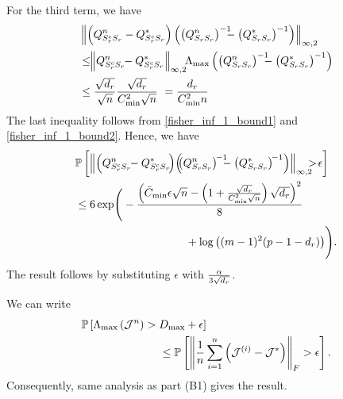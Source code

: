 For the third term, we have
\begin{equation}
\begin{aligned}
&\norm{\left(\fisher^n_{\support^c_\svert\support_\svert}-\fisher^*_{\support^c_\svert\support_\svert}\right) \left(\left(\fisher^n_{\support_\svert\support_\svert}\right)^{-1}\!\!\!\! -\left(\fisher^*_{\support_\svert\support_\svert}\right)^{-1}\right)}{\infty,2}\\ &\leq\!\! \norm{\fisher^n_{\support^c_\svert\support_\svert}\!\!-\fisher^*_{\support^c_\svert\support_\svert}}{\infty,2} \!\!\Lambda_{\max}\left(\left(\fisher^n_{\support_\svert\support_\svert}\right)^{-1}\!\!\!\! -\left(\fisher^*_{\support_\svert\support_\svert}\right)^{-1}\right)\\
&\leq\frac{\sqrt{d_\svert}}{\sqrt{n}}\frac{\sqrt{d_\svert}}{C_{\min}^2\sqrt{n}}\,\,=\frac{d_\svert}{C_{\min}^2n}
\end{aligned}
\nonumber
\end{equation}
The last inequality follows from \eqref{fisher_inf_1_bound1} and \eqref{fisher_inf_1_bound2}. Hence, we have
\begin{equation}
\begin{aligned}
&\mathbb{P}\left[\norm{\left(\fisher^n_{\support^c_\svert\support_\svert}\!\! -\fisher^*_{\support^c_\svert\support_\svert}\!\right)\! \left(\!\!\left(\fisher^n_{\support_\svert\support_\svert}\right)^{\!-1}\!\!\!\! -\left(\fisher^*_{\support_\svert\support_\svert}\right)^{\!-1}\right)}{\infty,2}\!\!\!\!>\!\epsilon\right]\\ &\leq 6\exp\Biggr(-\frac{\left(\bar{C}_{\min}\epsilon\sqrt{n}-\left(1+\frac{\sqrt{d_\svert}}{C_{\min}^2\sqrt{n}}\right)\sqrt{d_\svert}\right)^2}{8}\\ &\qquad\qquad\qquad\qquad\qquad+\log\left((m-1)^2(p-1-d_\svert)\right)\Biggr).
\end{aligned}
\nonumber
\end{equation}
The result follows by substituting $\epsilon$ with $\frac{\alpha}{3\sqrt{d_{r}}}$.

 We can write
\begin{equation}
\begin{aligned}
&\mathbb{P}\left[\Lambda_{\max}\left(\mathcal{J}^n\right)> D_{\max}+\epsilon\right]\\ &\qquad\qquad\qquad\quad\leq\mathbb{P}\left[\left\|\frac{1}{n}\sum_{i=1}^n\left(\mathcal{J}^{(i)}-\mathcal{J}^*\right)\right\|_{F}>\epsilon\right].
\end{aligned}
\nonumber
\end{equation}
Consequently, same analysis as part (B1) gives the result.\\

